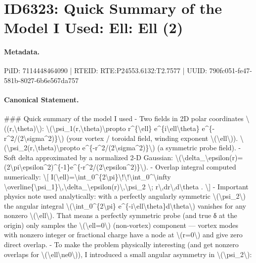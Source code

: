 \section*{ID6323: Quick Summary of the Model I Used: Ell: Ell (2)}
\paragraph{Metadata.}
PiID: 7114448464090 | RTEID: RTE:P24553.6132:T2.7577 | UUID: 790fc051-fe47-581b-8027-6b6e567da757

\paragraph{Canonical Statement.}
\#\#\# Quick summary of the model I used - Two fields in 2D polar coordinates \textbackslash{}((r,\textbackslash{}theta)\textbackslash{}): \textbackslash{}(\textbackslash{}psi\_1(r,\textbackslash{}theta)\textbackslash{}propto r\textasciicircum{}\{\textbackslash{}ell\} e\textasciicircum{}\{i\textbackslash{}ell\textbackslash{}theta\} e\textasciicircum{}\{-r\textasciicircum{}2/(2\textbackslash{}sigma\textasciicircum{}2)\}\textbackslash{}) (your vortex / toroidal field, winding exponent \textbackslash{}(\textbackslash{}ell\textbackslash{})). \textbackslash{}(\textbackslash{}psi\_2(r,\textbackslash{}theta)\textbackslash{}propto e\textasciicircum{}\{-r\textasciicircum{}2/(2\textbackslash{}sigma\textasciicircum{}2)\}\textbackslash{}) (a symmetric probe field). - Soft delta approximated by a normalized 2-D Gaussian: \textbackslash{}(\textbackslash{}delta\_\textbackslash{}epsilon(r)=(2\textbackslash{}pi\textbackslash{}epsilon\textasciicircum{}2)\textasciicircum{}\{-1\}e\textasciicircum{}\{-r\textasciicircum{}2/(2\textbackslash{}epsilon\textasciicircum{}2)\}\textbackslash{}). - Overlap integral computed numerically: \textbackslash{}[ I(\textbackslash{}ell)=\textbackslash{}int\_0\textasciicircum{}\{2\textbackslash{}pi\}\textbackslash{}!\textbackslash{}!\textbackslash{}int\_0\textasciicircum{}\textbackslash{}infty \textbackslash{}overline\{\textbackslash{}psi\_1\}\textbackslash{},\textbackslash{}delta\_\textbackslash{}epsilon(r)\textbackslash{},\textbackslash{}psi\_2 \textbackslash{}; r\textbackslash{},dr\textbackslash{},d\textbackslash{}theta . \textbackslash{}] - Important physics note used analytically: with a perfectly angularly symmetric \textbackslash{}(\textbackslash{}psi\_2\textbackslash{}) the angular integral \textbackslash{}(\textbackslash{}int\_0\textasciicircum{}\{2\textbackslash{}pi\} e\textasciicircum{}\{-i\textbackslash{}ell\textbackslash{}theta\}d\textbackslash{}theta\textbackslash{}) vanishes for any nonzero \textbackslash{}(\textbackslash{}ell\textbackslash{}). That means a perfectly symmetric probe (and true δ at the origin) only samples the \textbackslash{}(\textbackslash{}ell=0\textbackslash{}) (non-vortex) component — vortex modes with nonzero integer or fractional charge have a node at \textbackslash{}(r=0\textbackslash{}) and give zero direct overlap. - To make the problem physically interesting (and get nonzero overlaps for \textbackslash{}(\textbackslash{}ell\textbackslash{}ne0\textbackslash{})), I introduced a small angular asymmetry in \textbackslash{}(\textbackslash{}psi\_2\textbackslash{}): 